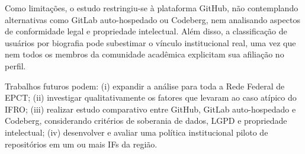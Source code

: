 \documentclass[english, spanish, brazilian]{RBIEarticle}
\begin{document}
Como limitações, o estudo restringiu-se à plataforma GitHub, não contemplando alternativas como GitLab auto-hospedado ou Codeberg, nem analisando aspectos de conformidade legal e propriedade intelectual. Além disso, a classificação de usuários por biografia pode subestimar o vínculo institucional real, uma vez que nem todos os membros da comunidade acadêmica explicitam sua afiliação no perfil.

Trabalhos futuros podem: (i) expandir a análise para toda a Rede Federal de EPCT; (ii) investigar qualitativamente os fatores que levaram ao caso atípico do IFRO; (iii) realizar estudo comparativo entre GitHub, GitLab auto-hospedado e Codeberg, considerando critérios de soberania de dados, LGPD e propriedade intelectual; (iv) desenvolver e avaliar uma política institucional piloto de repositórios em um ou mais IFs da região.
\end{document}
